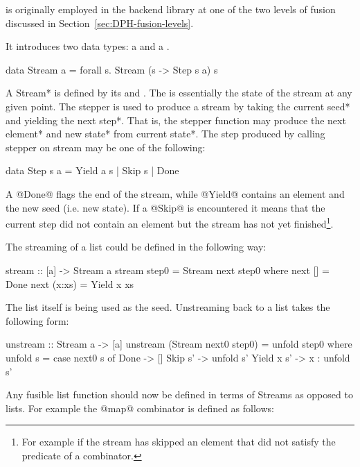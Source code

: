 \documentclass[preamble.tex]{subfiles}
\begin{document}
 \cite{CLS07,CSL06} is originally employed in the \DPH backend library at one of the two levels of fusion discussed in Section~\ref{sec:DPH-fusion-levels}.

It introduces two data types: a  and a .

\begin{hscode}
data Stream a = forall s. Stream (s -> Step s a) s
\end{hscode}


A \*Stream* is defined by its  and . The  is essentially the state of the stream at any given point. The stepper is used to produce a stream by taking the current \*seed* and yielding the \*next step*. That is, the stepper function may produce the next \*element* and \*new state* from \*current state*. The step produced by calling stepper on stream may be one of the following:


\begin{hscode}
data Step s a = Yield a s
              | Skip s
              | Done
\end{hscode}


A @Done@ flags the end of the stream, while @Yield@ contains an element and the new seed (i.e. new state). If a @Skip@ is encountered it means that the current step did not contain an element but the stream has not yet finished\footnote{For example if the stream has skipped an element that did not satisfy the predicate of a  combinator.}.

The streaming of a list could be defined in the following way:

\begin{hscode}
stream :: [a] -> Stream a
stream step0 = Stream next step0
  where next []     = Done
        next (x:xs) = Yield x xs
\end{hscode}


The list itself is being used as the seed. Unstreaming back to a list takes the following form:


\begin{hscode}
unstream :: Stream a -> [a]
unstream (Stream next0 step0) = unfold step0
  where unfold s = case next0 s of
          Done       -> []
          Skip s'    -> unfold s'
          Yield x s' -> x : unfold s'
\end{hscode}


Any fusible list function should now be defined in terms of Streams as opposed to lists. For example the @map@ combinator is defined as follows:
\end{document}
